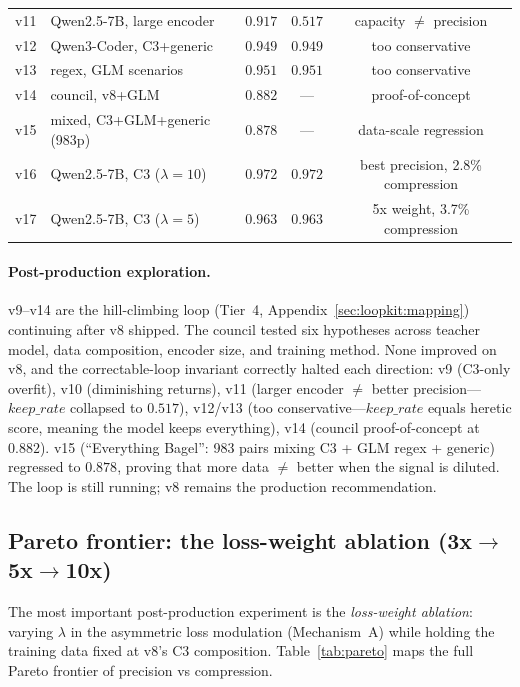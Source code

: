 \begin{table}[h]
\begin{tabular}{llccc}
v11 & Qwen2.5-7B, large encoder    & $0.917$ & $0.517$ & capacity $\neq$ precision \\
v12 & Qwen3-Coder, C3+generic      & $0.949$ & $0.949$ & too conservative \\
v13 & regex, GLM scenarios         & $0.951$ & $0.951$ & too conservative \\
v14 & council, v8+GLM              & $0.882$ & ---     & proof-of-concept \\
v15 & mixed, C3+GLM+generic (983p) & $0.878$ & ---     & data-scale regression \\
v16 & Qwen2.5-7B, C3 ($\lambda{=}10$) & $0.972$ & $0.972$ & best precision, 2.8\% compression \\
v17 & Qwen2.5-7B, C3 ($\lambda{=}5$)  & $0.963$ & $0.963$ & 5x weight, 3.7\% compression \\
\bottomrule
\end{tabular}
\end{table}

\paragraph{Post-production exploration.} v9--v14 are the hill-climbing loop
(Tier~4, Appendix~\ref{sec:loopkit:mapping}) continuing after v8 shipped.
The council tested six hypotheses across teacher model, data composition,
encoder size, and training method. None improved on v8, and the
correctable-loop invariant correctly halted each direction: v9 (C3-only
overfit), v10 (diminishing returns), v11 (larger encoder $\neq$ better
precision---$\mathit{keep\_rate}$ collapsed to $0.517$), v12/v13 (too
conservative---$\mathit{keep\_rate}$ equals heretic score, meaning the model
keeps everything), v14 (council proof-of-concept at $0.882$). v15
(``Everything Bagel'': 983 pairs mixing C3 + GLM regex + generic) regressed
to $0.878$, proving that more data $\neq$ better when the signal is
diluted. The loop is still running; v8 remains the production recommendation.

\subsection{Pareto frontier: the loss-weight ablation (3x$\to$5x$\to$10x)}
\label{sec:eval:pareto}

The most important post-production experiment is the \emph{loss-weight
ablation}: varying $\lambda$ in the asymmetric loss modulation
(Mechanism~A) while holding the training data fixed at v8's C3 composition.
Table~\ref{tab:pareto} maps the full Pareto frontier of precision vs
compression.


